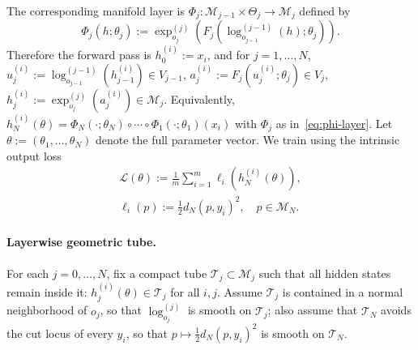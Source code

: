 \documentclass[letterpaper]{article}
\begin{document}
The corresponding manifold layer is \(\Phi_j:\mathcal M_{j-1}\times
\Theta_j\to \mathcal M_j\) defined by
\begin{equation}
\label{eq:phi-layer}
\Phi_j(h;\theta_j)
:=
\exp_{o_j}^{(j)}
\left(
F_j\left(
\log_{o_{j-1}}^{(j-1)}(h);
\theta_j
\right)
\right).
\end{equation}
Therefore the forward pass is \(h_0^{(i)}:=x_i\), and for \(j=1,\dots,N\),
\(u_j^{(i)}:=\log_{o_{j-1}}^{(j-1)}(h_{j-1}^{(i)})\in V_{j-1}\),
\(a_j^{(i)}:=F_j(u_j^{(i)};\theta_j)\in V_j\),
\(h_j^{(i)}:=\exp_{o_j}^{(j)}(a_j^{(i)})\in \mathcal M_j\). Equivalently,
$h_N^{(i)}(\theta) = \Phi_N(\cdot;\theta_N) \circ \cdots \circ
\Phi_1(\cdot;\theta_1)(x_i)$ with $\Phi_j$ as
in~\eqref{eq:phi-layer}. Let \(\theta:=(\theta_1,\dots,\theta_N)\)
denote the full parameter vector. We train using the intrinsic output loss
\[
\begin{gathered}
\mathcal L(\theta)
:=
\frac1m\sum_{i=1}^m
\ell_i(h_N^{(i)}(\theta)),\\
\ell_i(p)
:=
\frac12 d_N(p,y_i)^2,
\quad p\in \mathcal M_N.
\end{gathered}
\]

\paragraph{Layerwise geometric tube.}
For each \(j=0,\dots,N\), fix a compact tube \(\mathcal T_j\subset
\mathcal M_j\) such that all hidden states remain inside it:
\(h_j^{(i)}(\theta)\in \mathcal T_j\) for all \(i,j\). Assume
\(\mathcal T_j\) is contained in a normal neighborhood of \(o_j\), so that
\(\log_{o_j}^{(j)}\) is smooth on \(\mathcal T_j\); also assume that
\(\mathcal T_N\) avoids the cut locus of every \(y_i\), so that
\(p\mapsto \frac12 d_N(p,y_i)^2\) is smooth on \(\mathcal T_N\).
\end{document}
